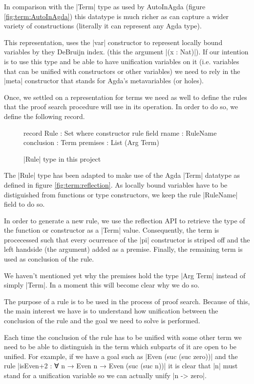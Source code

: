 \documentclass[a4paper]{article}
\begin{document}
In comparison with the |Term| type as used by AutoInAgda (figure
\ref{fig:term:AutoInAgda}) this datatype is much richer as can capture a wider
variety of constructions (literally it can represent any Agda type).

This representation, uses the |var| constructor to represent locally bound
variables by they DeBruijn index. (this the argument |(x : Nat)|). If our
intention is to use this type and be able to have unification variables on it
(i.e. variables that can be unified with constructors or other variables) we
need to rely in the |meta| constructor that stands for Agda's metavariables (or
holes).

Once, we settled on a representation for terms we need as well to define the
rules that the proof search procedure will use in its operation. In order to do
so, we define the following record.

\begin{figure}
\small
\begin{code}
  record Rule : Set where
    constructor rule
    field
      rname       : RuleName
      conclusion  : Term
      premises    : List (Arg Term)
\end{code}
  \label{fig:rule:reflection}
  \caption{|Rule| type in this project}
\end{figure}

The |Rule| type has been adapted to make use of the Agda |Term| datatype as
defined in figure \ref{fig:term:reflection}. As locally bound variables have to
be distiguished from functions or type constructors, we keep the rule |RuleName|
field to do so.

In order to generate a new rule, we use the reflection API to retrieve the type
of the function or constructor as a |Term| value. Consequently, the term is
procecessed such that every ocurrence of the |pi| constructor is striped off and
the left handside (the argument) added as a premise. Finally, the remaining term
is used as conclusion of the rule.

We haven't mentioned yet why the premises hold the type |Arg Term| instead of
simply |Term|. In a moment this will become clear why we do so.

The purpose of a rule is to be used in the process of proof search. Because of
this, the main interest we have is to understand how unification between the
conclusion of the rule and the goal we need to solve is performed.

Each time the conclusion of the rule has to be unified with some other term we
need to be able to distinguish in the term which subparts of it are open to be
unified. For example, if we have a goal such as |Even (suc (suc zero))| and the
rule |isEven+2 : ∀ {n} → Even n → Even (suc (suc n))| it is clear that
|n| must stand for a unification variable so we can actually unify |n -> zero|.
\end{document}
